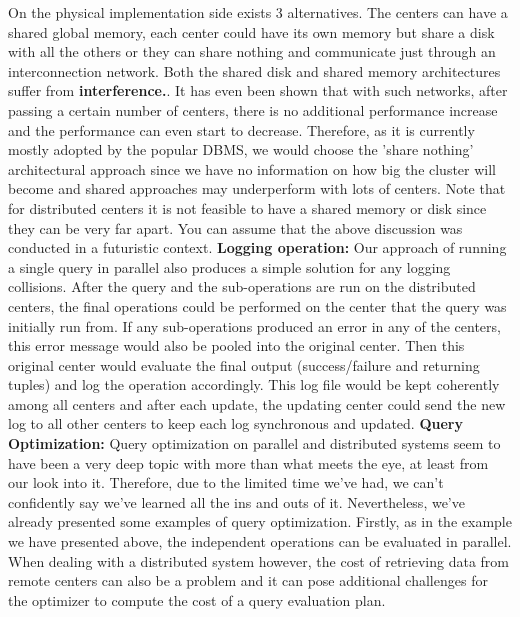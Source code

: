 \documentclass{article}
\begin{document}
On the physical implementation side exists 3 alternatives. The centers can have a shared global memory, each center could have its own memory but share a disk with all the others or they can share nothing and communicate just through an interconnection network. Both the shared disk and shared memory architectures suffer from \textbf{interference.}. It has even been shown that with such networks, after passing a certain number of centers, there is no additional performance increase and the performance can even start to decrease. Therefore, as it is currently mostly adopted by the popular DBMS, we would choose the 'share nothing' architectural approach since we have no information on how big the cluster will become and shared approaches may underperform with lots of centers. Note that for distributed centers it is not feasible to have a shared memory or disk since they can be very far apart. You can assume that the above discussion was conducted in a futuristic context.  \newline
\textbf{Logging operation:} Our approach of running a single query in parallel also produces a simple solution for any logging collisions. After the query and the sub-operations are run on the distributed centers, the final operations could be performed on the center that the query was initially run from. If any sub-operations produced an error in any of the centers, this error message would also be pooled into the original center. Then this original center would evaluate the final output (success/failure and returning tuples) and log the operation accordingly. This log file would be kept coherently among all centers and after each update, the updating center could send the new log to all other centers to keep each log synchronous and updated. \newline
\textbf{Query Optimization:} Query optimization on parallel and distributed systems seem to have been a very deep topic with more than what meets the eye, at least from our look into it. Therefore, due to the limited time we've had, we can't confidently say we've learned all the ins and outs of it. Nevertheless, we've already presented some examples of query optimization. Firstly, as in the example we have presented above, the independent operations can be evaluated in parallel. When dealing with a distributed system however, the cost of retrieving data from remote centers can also be a problem and it can pose additional challenges for the optimizer to compute the cost of a query evaluation plan. 
\end{document}
